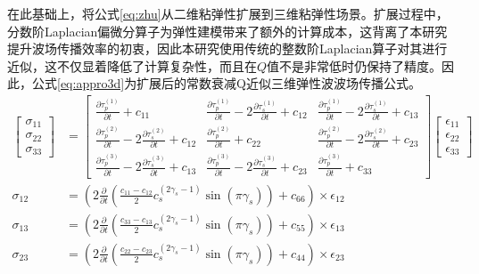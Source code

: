 在此基础上，将公式\ref{eq:zhu}从二维粘弹性扩展到三维粘弹性场景。扩展过程中，分数阶Laplacian偏微分算子为弹性建模带来了额外的计算成本，这背离了本研究提升波场传播效率的初衷，因此本研究使用传统的整数阶Laplacian算子对其进行近似，这不仅显着降低了计算复杂性，而且在$Q$值不是非常低时仍保持了精度\cite{shen2015image}。因此，公式\ref{eq:appro3d}为扩展后的常数衰减Q近似三维弹性波波场传播公式。
\begin{equation}
\begin{aligned}
\begin{bmatrix} \sigma_{11}\\ \sigma_{22}\\ \sigma_{33} \end{bmatrix} &= \begin{bmatrix} \frac{\partial \tau_p^{(1)}}{\partial t} + c_{11} & \frac{\partial \tau_p^{(1)}}{\partial t} - 2\frac{\partial \tau_s^{(1)}}{\partial t} +c_{12}& \frac{\partial \tau_p^{(1)}}{\partial t} - 2\frac{\partial \tau_s^{(1)}}{\partial t} +c_{13} \\ \frac{\partial \tau_p^{(2)}}{\partial t} - 2\frac{\partial \tau_s^{(2)}}{\partial t} +c_{12}& \frac{\partial \tau_p^{(2)}}{\partial t} + c_{22} & \frac{\partial \tau_p^{(2)}}{\partial t} - 2\frac{\partial \tau_s^{(2)}}{\partial t} +c_{23}\\ \frac{\partial \tau_p^{(3)}}{\partial t} - 2\frac{\partial \tau_s^{(3)}}{\partial t} +c_{13} & \frac{\partial \tau_p^{(3)}}{\partial t} - 2\frac{\partial \tau_s^{(3)}}{\partial t} +c_{23} & \frac{\partial \tau_p^{(3)}}{\partial t} + c_{33} \end{bmatrix} \begin{bmatrix} \epsilon_{11}\\ \epsilon_{22}\\ \epsilon_{33} \end{bmatrix} \\
\sigma_{12} &= \left ( 2\frac{\partial}{\partial t} \left( \frac{c_{11}-c_{12}}{2}c_s^{(2\gamma_s-1)}\sin(\pi\gamma_s) \right) + c_{66} \right )\times \epsilon_{12}\\
\sigma_{13} &= \left ( 2\frac{\partial}{\partial t} \left( \frac{c_{33}-c_{13}}{2}c_s^{(2\gamma_s-1)}\sin(\pi\gamma_s) \right) + c_{55} \right )\times \epsilon_{13} \\
\sigma_{23} &= \left ( 2\frac{\partial}{\partial t} \left( \frac{c_{22}-c_{23}}{2}c_s^{(2\gamma_s-1)}\sin(\pi\gamma_s) \right) + c_{44} \right )\times \epsilon_{23}
\end{aligned}
\label{eq:appro3d}
\end{equation}
